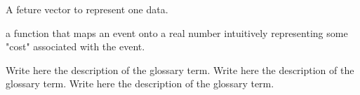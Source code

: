 %
%


 A feture vector to represent one data.

 a function that maps an event onto a real number intuitively representing some "cost" associated with the event.

 Write here the description of the glossary term. Write here the description of the glossary term. Write here the description of the glossary term.
